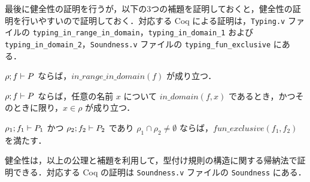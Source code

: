 最後に健全性の証明を行うが，以下の3つの補題を証明しておくと，健全性の証明を行いやすいので証明しておく．対応する Coq による証明は，\texttt{Typing.v} ファイルの \texttt{typing\_in\_range\_in\_domain}，\texttt{typing\_in\_domain\_1} および \texttt{typing\_in\_domain\_2}，\texttt{Soundness.v} ファイルの \texttt{typing\_fun\_exclusive} にある．


\begin{lem}[定義域と値域の一致]
  \label{lemma:typing_range_domain}
  $\rho ; f \vdash P$ ならば，$in\_range\_in\_domain(f)$ が成り立つ．
\end{lem}

\begin{lem}
  \label{lemma:typing_recep_domain}
  $\rho ; f \vdash P$ ならば，任意の名前 $ x $ について $in\_domain(f, x) $ であるとき，かつそのときに限り，$ x \in \rho $ が成り立つ．
\end{lem}

\begin{lem}
  \label{lemma:typing_fun_exclusive}
  $\rho_1 ; f_1 \vdash P_1$ かつ $\rho_2 ; f_2 \vdash P_2$ であり $ \rho_1 \cap \rho_2 \neq \emptyset $ ならば，$fun\_exclusive(f_1, f_2)$ を満たす．
\end{lem}

健全性は，以上の公理と補題を利用して，型付け規則の構造に関する帰納法で証明できる．対応する Coq の証明は \texttt{Soundness.v} ファイルの \texttt{Soundness} にある．







